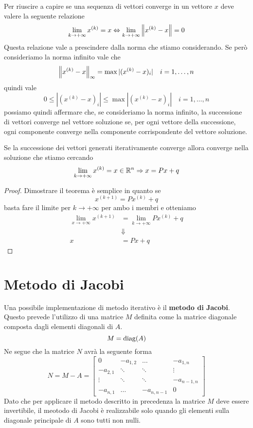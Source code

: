 Per riuscire a capire se una sequenza di vettori converge in un vettore $x$ deve valere la seguente relazione
\[ \lim_{k \to +\infty} x^{(k)} = x \Leftrightarrow \lim_{k \to +\infty} \left\lVert x^{(k)} - x\right\rVert = 0 \]
Questa relazione vale a prescindere dalla norma che stiamo considerando. Se però consideriamo la norma infinito
vale che
\[ \left\lVert x^{(k)} - x\right\rVert_\infty = \max | (x^{(k)} - x)_i | \quad i = 1, \dots, n \]
quindi vale
\[ 0 \leq | (x^{(k)} - x)_i | \leq \max | (x^{(k)} - x)_i | \quad i = 1, \dots, n \]
possiamo quindi affermare che, se consideriamo la norma infinito, la successione di vettori converge nel vettore
soluzione se, per ogni vettore della successione, ogni componente converge nella componente corrispondente del
vettore soluzione.

\begin{theorem}
	Se la successione dei vettori generati iterativamente converge allora converge nella soluzione che stiamo
	cercando
	\[ \lim_{k \to +\infty} x^{(k)} = x \in \mathbb{R}^n \Rightarrow x = Px + q \]
	\begin{proof}
		Dimostrare il teorema è semplice in quanto se
		\[ x^{(k+1)} = P x^{(k)} + q \]
		basta fare il limite per $k \to +\infty$ per ambo i membri e otteniamo
		\begin{align*}
			\lim_{x \to +\infty} x^{(k+1)} & = \lim_{k \to +\infty} P x^{(k)} + q \\
			                               & \Downarrow                           \\
			x                              & = P x + q
		\end{align*}
	\end{proof}
\end{theorem}

\section{Metodo di Jacobi}
Una possibile implementazione di metodo iterativo è il \textbf{metodo di Jacobi}. Questo prevede l'utilizzo
di una matrice $M$ definita come la matrice diagonale composta dagli elementi diagonali di $A$.
\[ M = \operatorname{diag} (A) \]
Ne segue che la matrice $N$ avrà la seguente forma
\[
	N = M - A = \begin{bmatrix}
		0        & -a_{1,2} & \dots      & -a_{1,n}   \\
		-a_{2,1} & \ddots   & \ddots     & \vdots     \\
		\vdots   & \ddots   & \ddots     & -a_{n-1,n} \\
		-a_{n,1} & \dots    & -a_{n,n-1} & 0
	\end{bmatrix}
\]
Dato che per applicare il metodo descritto in precedenza la matrice $M$ deve essere invertibile, il meotodo di
Jacobi è realizzabile solo quando gli elementi sulla diagonale principale di $A$ sono tutti non nulli.

